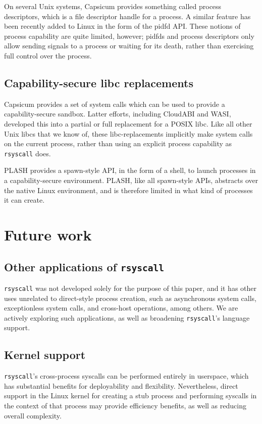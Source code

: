 \documentclass[letterpaper,twocolumn,10pt]{article}
\begin{document}
On several Unix systems,
Capsicum\cite{capsicum} provides something called process descriptors,
which is a file descriptor handle for a process.
A similar feature has been recently added to Linux in the form of the pidfd API\cite{pidfd}.
These notions of process capability are quite limited, however;
pidfds and process descriptors only allow sending signals to a process or waiting for its death,
rather than exercising full control over the process.
\subsection{Capability-secure libc replacements}
Capsicum\cite{capsicum} provides a set of system calls
which can be used to provide a capability-secure sandbox.
Latter efforts\cite{oblivious}, including CloudABI\cite{cloudabi} and WASI\cite{wasi},
developed this into a partial or full replacement for a POSIX libc.
Like all other Unix libcs that we know of,
these libc-replacements implicitly make system calls on the current process,
rather than using an explicit process capability as \texttt{rsyscall} does.

PLASH\cite{plash} provides a spawn-style API, in the form of a shell,
to launch processes in a capability-secure environment.
PLASH, like all spawn-style APIs, abstracts over the native Linux environment,
and is therefore limited in what kind of processes it can create.
\section{Future work}\label{future_work}
\subsection{Other applications of \texttt{rsyscall}}
\texttt{rsyscall} was not developed solely for the purpose of this paper,
and it has other uses unrelated to direct-style process creation,
such as asynchronous system calls, exceptionless system calls\cite{flexsc}, and cross-host operations, among others.
We are actively exploring such applications,
as well as broadening \texttt{rsyscall}'s language support.
\subsection{Kernel support}
\texttt{rsyscall}'s cross-process syscalls can be performed entirely in userspace,
which has substantial benefits for deployability and flexibility.
Nevertheless, direct support in the Linux kernel
for creating a stub process and performing syscalls in the context of that process
may provide efficiency benefits, as well as reducing overall complexity.
\end{document}

